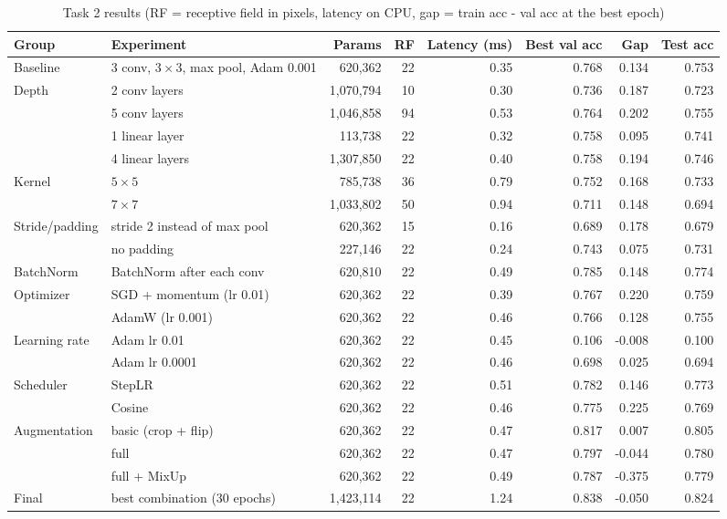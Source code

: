 \documentclass[conference]{IEEEtran}
\begin{document}
\begin{table}[t]
\centering
\caption{Task 2 results (RF = receptive field in pixels, latency on CPU, gap = train acc - val acc at the best epoch)}
\label{tab:task2}
\begin{tabular}{|l|l|r|r|r|r|r|r|}
\hline
Group & Experiment & Params & RF & Latency (ms) & Best val acc & Gap & Test acc \\
\hline
Baseline & 3 conv, $3\times3$, max pool, Adam 0.001 & 620,362 & 22 & 0.35 & 0.768 & 0.134 & 0.753 \\
\hline
Depth & 2 conv layers & 1,070,794 & 10 & 0.30 & 0.736 & 0.187 & 0.723 \\
 & 5 conv layers & 1,046,858 & 94 & 0.53 & 0.764 & 0.202 & 0.755 \\
 & 1 linear layer & 113,738 & 22 & 0.32 & 0.758 & 0.095 & 0.741 \\
 & 4 linear layers & 1,307,850 & 22 & 0.40 & 0.758 & 0.194 & 0.746 \\
\hline
Kernel & $5\times5$ & 785,738 & 36 & 0.79 & 0.752 & 0.168 & 0.733 \\
 & $7\times7$ & 1,033,802 & 50 & 0.94 & 0.711 & 0.148 & 0.694 \\
\hline
Stride/padding & stride 2 instead of max pool & 620,362 & 15 & 0.16 & 0.689 & 0.178 & 0.679 \\
 & no padding & 227,146 & 22 & 0.24 & 0.743 & 0.075 & 0.731 \\
\hline
BatchNorm & BatchNorm after each conv & 620,810 & 22 & 0.49 & 0.785 & 0.148 & 0.774 \\
\hline
Optimizer & SGD + momentum (lr 0.01) & 620,362 & 22 & 0.39 & 0.767 & 0.220 & 0.759 \\
 & AdamW (lr 0.001) & 620,362 & 22 & 0.46 & 0.766 & 0.128 & 0.755 \\
\hline
Learning rate & Adam lr 0.01 & 620,362 & 22 & 0.45 & 0.106 & -0.008 & 0.100 \\
 & Adam lr 0.0001 & 620,362 & 22 & 0.46 & 0.698 & 0.025 & 0.694 \\
\hline
Scheduler & StepLR & 620,362 & 22 & 0.51 & 0.782 & 0.146 & 0.773 \\
 & Cosine & 620,362 & 22 & 0.46 & 0.775 & 0.225 & 0.769 \\
\hline
Augmentation & basic (crop + flip) & 620,362 & 22 & 0.47 & 0.817 & 0.007 & 0.805 \\
 & full & 620,362 & 22 & 0.47 & 0.797 & -0.044 & 0.780 \\
 & full + MixUp & 620,362 & 22 & 0.49 & 0.787 & -0.375 & 0.779 \\
\hline
Final & best combination (30 epochs) & 1,423,114 & 22 & 1.24 & 0.838 & -0.050 & 0.824 \\
\hline
\end{tabular}
\end{table}
\end{document}

